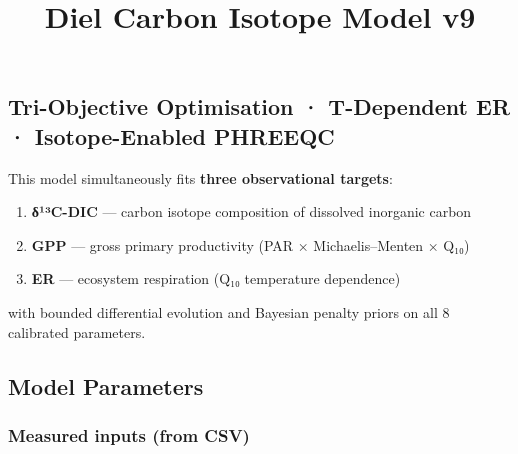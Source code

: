\documentclass[
  letterpaper,
  DIV=11,
  numbers=noendperiod]{scrartcl}
\title{Diel Carbon Isotope Model v9}
\author{}
\date{}
\providecommand{\tightlist}{%
  \setlength{\itemsep}{0pt}\setlength{\parskip}{0pt}}
\begin{document}
\maketitle


\subsection{Tri-Objective Optimisation · T-Dependent ER ·
Isotope-Enabled
PHREEQC}\label{tri-objective-optimisation-t-dependent-er-isotope-enabled-phreeqc}

This model simultaneously fits \textbf{three observational targets}:

\begin{enumerate}
\def\labelenumi{\arabic{enumi}.}
\tightlist
\item
  \textbf{δ¹³C-DIC} --- carbon isotope composition of dissolved
  inorganic carbon
\item
  \textbf{GPP} --- gross primary productivity (PAR × Michaelis--Menten ×
  Q₁₀)
\item
  \textbf{ER} --- ecosystem respiration (Q₁₀ temperature dependence)
\end{enumerate}

with bounded differential evolution and Bayesian penalty priors on all 8
calibrated parameters.

\subsection{Model Parameters}\label{model-parameters}

\subsubsection{Measured inputs (from
CSV)}\label{measured-inputs-from-csv}
\end{document}
